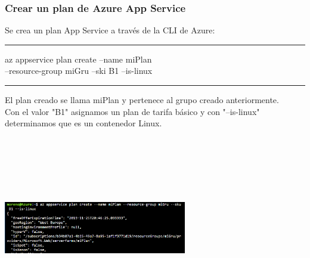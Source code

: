 \documentclass[english,runningheads,a4paper]{llncs}[2018/03/10]
\newenvironment{nscenter}
 {\parskip=0pt\par\nopagebreak\centering}
 {\par\noindent\ignorespacesafterend}
\begin{document}
\subsubsection*{Crear un plan de Azure App Service}
Se crea un plan App Service a través de la CLI de Azure:
\begin{nscenter}
\noindent\rule{10cm}{0.4pt}

az appservice plan create --name miPlan \\--resource-group miGru --ski B1 --is-linux

\noindent\rule{10cm}{0.4pt}
\end{nscenter}
\newline
El plan creado se llama miPlan y pertenece al grupo creado anteriormente.\\
Con el valor "B1" asignamos un plan de tarifa básico y con "--is-linux" 
determinamos que es un contenedor Linux.
\newline
\begin{nscenter}
\includegraphics[width=8cm,height=8cm,keepaspectratio]{./Contenedores/Azure/3.png}
\end{nscenter}
\end{document}
